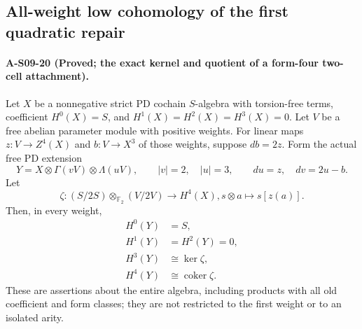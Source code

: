 \subsection{All-weight low cohomology of the first quadratic repair}

\paragraph{A-S09-20 (Proved; the exact kernel and quotient of a form-four two-cell attachment).}
Let $X$ be a nonnegative strict PD cochain $S$-algebra
with torsion-free terms, coefficient $H^0(X)=S$, and
$H^1(X)=H^2(X)=H^3(X)=0$.
Let $V$ be a free abelian parameter module with
positive weights.  For linear maps
$z:V\to Z^4(X)$ and $b:V\to X^3$ of those weights,
suppose $db=2z$.  Form the actual free PD extension
\[
 Y=X\otimes\Gamma(vV)\otimes\Lambda(uV),
 \qquad |v|=2,\quad |u|=3,
 \qquad du=z,\quad dv=2u-b.                         \tag{S09.85}
\]
Let
\[
 \zeta:(S/2S)\otimes_{\mathbb F_2}(V/2V)
                         \longrightarrow H^4(X),
                 s\otimes a\longmapsto s[z(a)].      \tag{S09.86}
\]
Then, in every weight,
\[
 \begin{split}
 H^0(Y)&=S,\\
 H^1(Y)&=H^2(Y)=0,\\
 H^3(Y)&\cong\ker\zeta,\\
 H^4(Y)&\cong\operatorname{coker}\zeta.
 \end{split}                                        \tag{S09.87}
\]
These are assertions about the entire algebra,
including products with all old coefficient and
form classes; they are not restricted to the first
weight or to an isolated arity.

